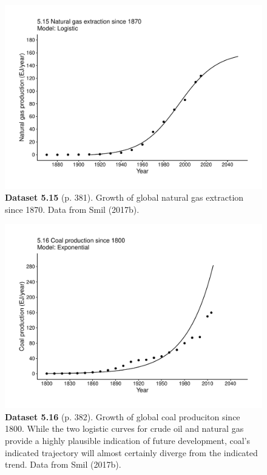 \documentclass[aps,rmp,preprint,superscriptaddress,10pt,onecolumn]{article}
\begin{document}
\clearpage
\begin{figure}[h]
\includegraphics[width=\textwidth]{output/figs-ggplot/5.15.pdf}
\caption*{\textbf{Dataset 5.15} (p. 381). Growth of global natural gas extraction since 1870. Data from Smil (2017b).}
\end{figure}
	
\clearpage
\begin{figure}[h]
\includegraphics[width=\textwidth]{output/figs-ggplot/5.16.pdf}
\caption*{\textbf{Dataset 5.16} (p. 382). Growth of global coal produciton since 1800. While the two logistic curves for crude oil and natural gas provide a highly plausible indication of future development, coal's indicated trajectory will almost certainly diverge from the indicated trend. Data from Smil (2017b). }
\end{figure}
	
\end{document}
